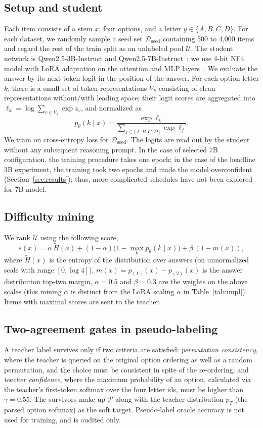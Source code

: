 \documentclass[conference]{IEEEtran}
\begin{document}
\subsection{Setup and student}
Each item consists of a stem $x$, four options, and a letter $y\in\{A,B,C,D\}$. For each dataset, we randomly sample a seed set $\mathcal{D}_{\text{seed}}$ containing 500 to 4{,}000 items and regard the rest of the train split as an unlabeled pool $\mathcal{U}$. The student network is Qwen2.5-3B-Instruct and Qwen2.5-7B-Instruct~\cite{qwen}; we use 4-bit NF4 model with LoRA adaptation on the attention and MLP layers~\cite{lora,qlora}. We evaluate the answer by its next-token logit in the position of the answer. For each option letter $k$, there is a small set of token representations $V_k$ consisting of clean representations without/with leading space; their logit scores are aggregated into $\ell_k=\log\sum_{v\in V_k}\exp z_v$, and normalized as 
\begin{equation}
p_\theta(k\mid x)=\frac{\exp \ell_k}{\sum_{j\in\{A,B,C,D\}}\exp \ell_j}.
\end{equation}
We train on cross-entropy loss for $\mathcal{D}_{\text{seed}}$. The logits are read out by the student without any subsequent reasoning prompt. In the case of selected 7B configuration, the training procedure takes one epoch; in the case of the headline 3B experiment, the training took two epochs and made the model overconfident (Section~\ref{sec:results}); thus, more complicated schedules have not been explored for 7B model.

\subsection{Difficulty mining}
We rank $\mathcal{U}$ using the following score,
\begin{equation}
s(x)=\alpha\,\tilde{H}(x)+(1-\alpha)\bigl(1-\textstyle\max_k p_\theta(k\mid x)\bigr)+\beta\,(1-m(x)),
\end{equation}
where $\tilde{H}(x)$ is the entropy of the distribution over answers (on unnormalized scale with range $[0,\log 4]$), $m(x)=p_{(1)}(x)-p_{(2)}(x)$ is the answer distribution top-two margin, $\alpha=0.5$ and $\beta=0.3$ are the weights on the above scales (this mining $\alpha$ is distinct from the LoRA scaling $\alpha$ in Table~\ref{tab:impl}). Items with maximal scores are sent to the teacher.

\subsection{Two-agreement gates in pseudo-labeling}
A teacher label survives only if two criteria are satisfied: \emph{permutation consistency}, where the teacher is queried on the original option ordering as well as a random permutation, and the choice must be consistent in spite of the re-ordering; and \emph{teacher confidence}, where the maximum probability of an option, calculated via the teacher's first-token softmax over the four letter ids, must be higher than $\gamma=0.55$. The survivors make up $\mathcal{P}$ along with the teacher distribution $p_T$ (the parsed option softmax) as the soft target. Pseudo-label oracle accuracy is not used for training, and is audited only.
\end{document}
